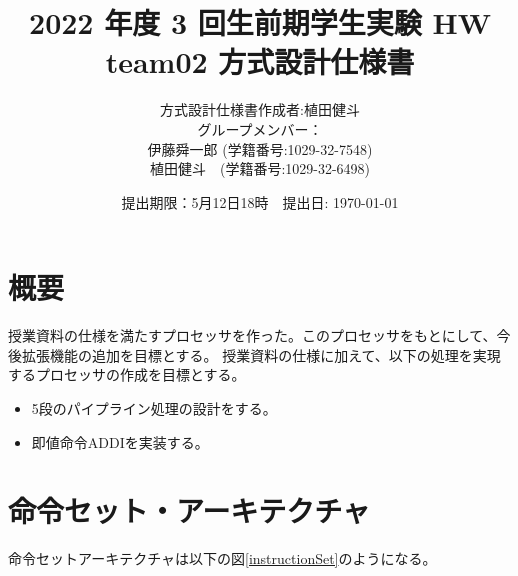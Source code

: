 \documentclass[a4j,titlepage]{jarticle}
\begin{document}
\title{2022 年度 3 回生前期学生実験 HW  \\ \bf team02 方式設計仕様書}
\author{方式設計仕様書作成者:植田健斗\\
グループメンバー：\\伊藤舜一郎 (学籍番号:1029-32-7548)
\\植田健斗　(学籍番号:1029-32-6498)}
\date{提出期限：5月12日18時　提出日: \today} %
\maketitle
\newpage

\section{概要}
授業資料の仕様を満たすプロセッサを作った。このプロセッサをもとにして、今後拡張機能の追加を目標とする。
授業資料の仕様に加えて、以下の処理を実現するプロセッサの作成を目標とする。
\begin{itemize}
\item 5段のパイプライン処理の設計をする。
\item 即値命令ADDIを実装する。
\end{itemize}

\section{命令セット・アーキテクチャ}
命令セットアーキテクチャは以下の図\ref{instructionSet}のようになる。
\end{document}
